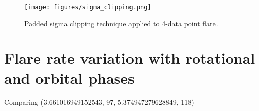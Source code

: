 \documentclass[fleqn,usenatbib,letters]{mnras}%
\begin{document}
\begin{figure}
\texttt{[image: figures/sigma\_clipping.png]} 
\caption{Padded sigma clipping technique applied to 4-data point flare.}
\label{fig:illustrate_clipping}
\end{figure}
\section{Flare rate variation with rotational and orbital phases}
Comparing
(3.661016949152543, 97, 5.374947279628849, 118)
\end{document}
